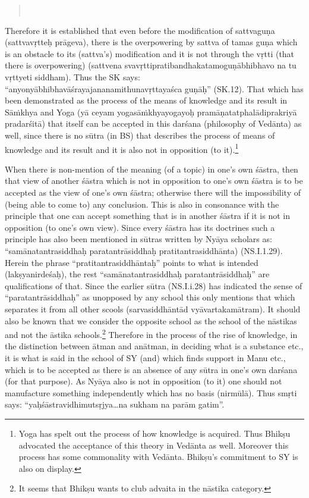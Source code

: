 \eject

\begin{verse}
\\
\end{verse}

Therefore it is established that even before the modification of sattvaguṇa (sattvavṛtteḥ prāgeva), there is the overpowering by sattva of tamas guṇa which is an obstacle to its (sattva’s) modification and it is not through the vṛtti (that there is overpowering) (sattvena svavṛttipratibandhakatamoguṇābhibhavo na tu vṛttyeti siddham). Thus the SK says: “anyonyābhibhavāśrayajananamithunavṛttayaśca guṇāḥ” (SK.12).  That which has been demonstrated as the process of the means of knowledge and its result in Sāṁkhya and Yoga (yā ceyam yogasāṁkhyayogayoḥ pramāṇatatphalādiprakriyā pradarśitā) that itself can   be accepted in this darśana (philosophy of Vedānta) as well, since there is no sūtra (in BS) that describes the process of means of knowledge and its result and it is also not in opposition (to it).\footnote{Yoga has spelt out the process of how knowledge is acquired. Thus Bhikṣu advocated the acceptance of this theory in Vedānta as well. Moreover this process has some commonality with Vedānta. Bhikṣu’s commitment to SY is also on display.}  

When there is non-mention of the meaning (of a topic) in one’s own śāstra, then that view of another śāstra which is not in opposition to one’s own śāstra is to be accepted as the view of one’s own śāstra; otherwise there will the impossibility of (being able to come to) any conclusion. This is also in consonance with the principle that one can accept something that is in another śāstra if it is not in opposition (to one’s own view). Since every śāstra has its doctrines such a principle has also been mentioned in sūtras written by Nyāya scholars as: “samānatantrasiddhaḥ paratantrāsiddhaḥ pratitantrasiddhānta) (NS.I.1.29). Herein the phrase “pratitantrasiddhāntaḥ” points to what is intended (lakṣyanirdeśaḥ), the rest “samānatantrasiddhaḥ paratantrāsiddhaḥ” are qualifications of that. Since the earlier sūtra (NS.I.i.28) has indicated the sense of “paratantrāsiddhaḥ” as unopposed by any school this only mentions that which separates it from all other scools (sarvasiddhāntād vyāvartakamātram). It should also be known that we consider the opposite school as the school of the nāstikas and not the āstika schools.\footnote{It seems that Bhikṣu wants to club advaita in the nāstika category.} Therefore in the process of the rise of knowledge, in the distinction between ātman and anātman, in deciding what is a substance etc., it is what is said in the school of SY (and) which finds support in Manu etc., which is to be accepted as there is an absence of any sūtra in one’s own darśana  (for that purpose).  As Nyāya also is not in opposition (to it) one should not manufacture something independently which has no basis (nirmūlā). Thus smṛti says: “yaḥśāstravidhimutsṛjya…na sukham na parām gatim”.  

